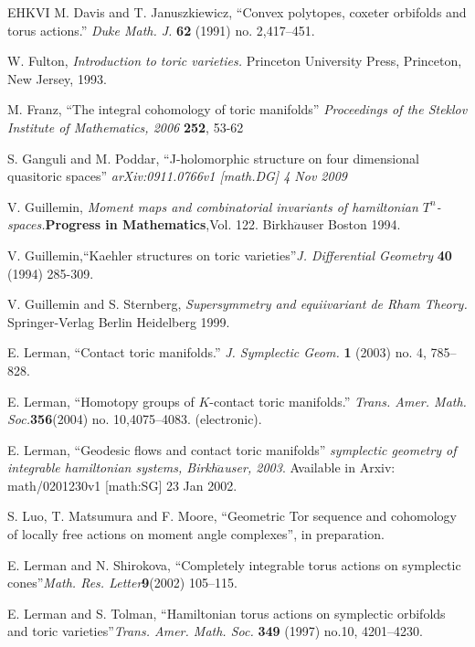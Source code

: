 \documentclass[12pt]{amsart}
\theoremstyle{definition}
\numberwithin{equation}{section}
\begin{document}
\begin{thebibliography}{EHKVI}
M. Davis and T. Januszkiewicz, ``Convex polytopes, coxeter orbifolds
and torus actions.'' {\em Duke Math. J.} {\bf 62} (1991) no.
2,417--451.

 W. Fulton, {\em Introduction to toric
varieties.} Princeton University Press, Princeton, New Jersey, 1993.

M. Franz, ``The integral cohomology of toric manifolds'' {\em
Proceedings of the Steklov Institute of Mathematics, 2006} {\bf
252}, 53-62

S. Ganguli and M. Poddar, ``J-holomorphic structure on four
dimensional quasitoric spaces'' {\em arXiv:0911.0766v1 [math.DG] 4
Nov 2009}

V. Guillemin, {\em Moment maps and combinatorial invariants of
hamiltonian $T^{n}$-spaces.}{\bf Progress in Mathematics},Vol. 122.
Birkh$\ddot{a}$user Boston 1994.

V. Guillemin,``Kaehler structures on toric varieties''{\em J.
Differential Geometry} {\bf 40} (1994) 285-309.

V. Guillemin and S. Sternberg, {\em Supersymmetry and equiivariant
de Rham Theory.} Springer-Verlag Berlin Heidelberg 1999.

E. Lerman,   ``Contact toric manifolds.'' {\em  J. Symplectic Geom.}
{\bf 1} (2003) no. 4, 785--828.

E. Lerman, ``Homotopy groups of $K$-contact toric manifolds.''{\em
Trans. Amer. Math. Soc.}{\bf 356}(2004) no. 10,4075--4083.
(electronic).

E. Lerman, ``Geodesic flows and contact toric manifolds'' {\em
symplectic geometry of integrable hamiltonian systems,
Birkh$\ddot{a}$user, 2003}. Available in Arxiv: math/0201230v1
[math:SG] 23 Jan 2002.


S. Luo, T. Matsumura and F. Moore, ``Geometric Tor sequence and
cohomology of locally free actions on moment angle complexes'', in
preparation.

E. Lerman and N. Shirokova, ``Completely integrable torus actions on
symplectic cones''{\em Math. Res. Letter}{\bf 9}(2002) 105--115.

E. Lerman and S. Tolman, ``Hamiltonian torus actions on symplectic
orbifolds and toric varieties''{\em Trans. Amer. Math. Soc.}{\bf
349} (1997) no.10, 4201--4230.


\end{thebibliography}
\end{document}
